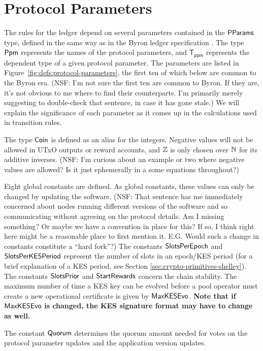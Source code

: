 \section{Protocol Parameters}
\label{sec:protocol-parameters}

The rules for the ledger depend on several parameters contained in the $\mathsf{PParams}$ type,
defined in the same way as in the Byron ledger specification \cite{byron_ledger_spec}.
The type $\mathsf{Ppm}$ represents the names of the protocol parameters,
and $\mathsf{T_{ppm}}$ represents the dependent type of a given protocol parameter.
The parameters are listed in Figure~\ref{fig:defs:protocol-parameters},
the first ten of which below are common to the Byron era.
(NSF: I'm not sure the first ten are common to Byron. If they are, it's not
obvious to me where to find their counterparts. I'm primarily merely suggesting
to double-check that sentence, in case it has gone stale.)
We will explain the significance of each parameter as it comes up in
the calculations used in transition rules.

The type $\mathsf{Coin}$ is defined as an alias for the integers.
Negative values will not be allowed in UTxO outputs or reward accounts,
and $\mathbb{Z}$ is only chosen over $\mathbb{N}$ for its additive inverses.
(NSF: I'm curious about an example or two where negative values are allowed?
Is it just ephemerally in a some equations throughout?)

Eight global constants are defined.
As global constants, these values can only be changed by updating the software.
(NSF: That sentence has me immediately concerned about nodes running different
versions of the software and so communicating without agreeing on the protocol
details. Am I missing something? Or maybe we have a convention in place for
this? If so, I think right here might be a reasonable place to first mention
it. E.G. Would such a change in constants constitute a ``hard fork''?)
The constants $\mathsf{SlotsPerEpoch}$ and $\mathsf{SlotsPerKESPeriod}$
represent the number of slots in an epoch/KES period (for a brief explanation
of a KES period, see Section \ref{sec:crypto-primitives-shelley}).
The constants $\mathsf{SlotsPrior}$ and $\mathsf{StartRewards}$ concern the chain stability.
The maximum number of time a KES key can be evolved before a pool operator
must create a new operational certificate is given by $\mathsf{MaxKESEvo}$.
\textbf{Note that if } $\mathsf{MaxKESEvo}$
\textbf{is changed, the KES signature format may have to change as well.}

The constant $\mathsf{Quorum}$ determines the quorum amount needed for votes on the
protocol parameter updates and the application version updates.

